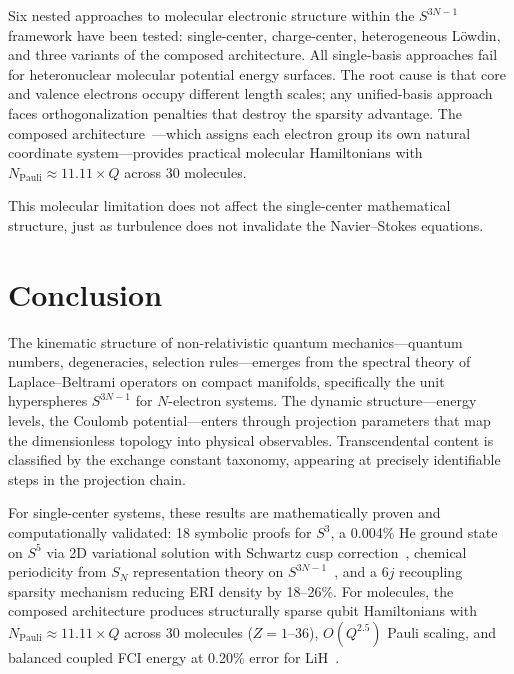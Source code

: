 \documentclass[aps,pra,twocolumn,superscriptaddress,longbibliography]{revtex4-2}
\begin{document}
Six nested approaches to molecular electronic structure within the
$S^{3N-1}$ framework have been tested: single-center, charge-center,
heterogeneous Löwdin, and three variants of the composed
architecture.  All single-basis approaches fail for heteronuclear
molecular potential energy surfaces.  The root cause is that core and
valence electrons occupy different length scales; any unified-basis
approach faces orthogonalization penalties that destroy the sparsity
advantage.  The composed architecture~\cite{Paper17}---which assigns
each electron group its own natural coordinate system---provides
practical molecular Hamiltonians with $N_{\text{Pauli}} \approx
11.11 \times Q$ across 30 molecules.

This molecular limitation does not affect the single-center mathematical
structure, just as turbulence does not invalidate the Navier--Stokes
equations.


\section{Conclusion}
\label{sec:conclusion}

The kinematic structure of non-relativistic quantum
mechanics---quantum numbers, degeneracies, selection rules---emerges
from the spectral theory of Laplace--Beltrami operators on compact
manifolds, specifically the unit hyperspheres $S^{3N-1}$ for
$N$-electron systems.  The dynamic structure---energy levels, the
Coulomb potential---enters through projection parameters that map the
dimensionless topology into physical observables.  Transcendental
content is classified by the exchange constant taxonomy, appearing at
precisely identifiable steps in the projection chain.

For single-center systems, these results are mathematically proven and
computationally validated: 18 symbolic proofs for $S^3$, a 0.004\% He
ground state on $S^5$ via 2D variational solution with Schwartz cusp
correction~\cite{Paper13}, chemical periodicity from $S_N$
representation theory on $S^{3N-1}$~\cite{Paper16}, and a 6$j$
recoupling sparsity mechanism reducing ERI density by 18--26\%.  For
molecules, the composed architecture produces structurally sparse qubit
Hamiltonians with $N_{\text{Pauli}} \approx 11.11 \times Q$ across 30
molecules ($Z = 1$--36), $O(Q^{2.5})$ Pauli scaling, and balanced
coupled FCI energy at 0.20\% error for
LiH~\cite{Paper17,Paper19,Paper20}.
\end{document}
